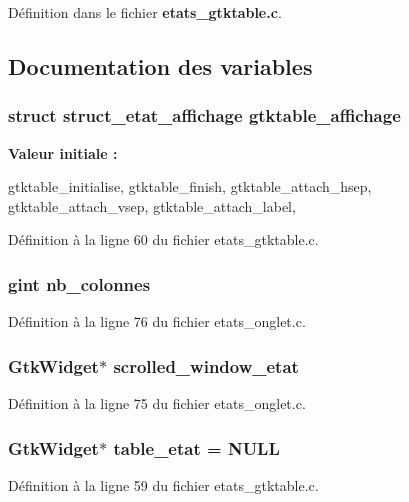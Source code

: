 Définition dans le fichier {\bf etats\_\-gtktable.c}.



\subsection{Documentation des variables}
\subsubsection[{gtktable\_\-affichage}]{\setlength{\rightskip}{0pt plus 5cm}struct {\bf struct\_\-etat\_\-affichage} {\bf gtktable\_\-affichage}}\label{etats__gtktable_8c_ad2d63b63790f190b5017e7b721f6f52c}
{\bfseries Valeur initiale :}
\begin{DoxyCode}
 {
    gtktable_initialise,
    gtktable_finish,
    gtktable_attach_hsep,
    gtktable_attach_vsep,
    gtktable_attach_label,
}
\end{DoxyCode}


Définition à la ligne 60 du fichier etats\_\-gtktable.c.

\subsubsection[{nb\_\-colonnes}]{\setlength{\rightskip}{0pt plus 5cm}gint {\bf nb\_\-colonnes}}\label{etats__gtktable_8c_a8c9db61caf800767da87c8e115ed2b12}


Définition à la ligne 76 du fichier etats\_\-onglet.c.

\subsubsection[{scrolled\_\-window\_\-etat}]{\setlength{\rightskip}{0pt plus 5cm}GtkWidget$\ast$ {\bf scrolled\_\-window\_\-etat}}\label{etats__gtktable_8c_adb1790226edec7f94cf9ddebf2790c62}


Définition à la ligne 75 du fichier etats\_\-onglet.c.

\subsubsection[{table\_\-etat}]{\setlength{\rightskip}{0pt plus 5cm}GtkWidget$\ast$ {\bf table\_\-etat} = NULL}\label{etats__gtktable_8c_a8acf276de2f2a805f29b0ab451bbcc6a}


Définition à la ligne 59 du fichier etats\_\-gtktable.c.


